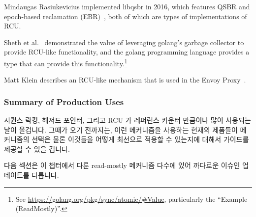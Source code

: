 Mindaugas Rasiukevicius implemented libqsbr in 2016, which features
QSBR and epoch-based reclamation
(EBR)~\cite{MindaugasRasiukevicius2016libqsbr},
both of which are types of implementations of RCU.

Sheth et al.~\cite{HarshalSheth2016goRCU}
demonstrated the value of leveraging golang's garbage
collector to provide RCU-like functionality, and
the golang programming language provides a  type that can
provide this functionality.\footnote{
	See \url{https://golang.org/pkg/sync/atomic/\#Value}, particularly
	the ``Example (ReadMostly)''.}

Matt Klein describes an RCU-like mechanism that is used in the Envoy
Proxy~\cite{MattKlein2017EnvoyRCU}.
\fi

\subsubsection{Summary of Production Uses}
\label{sec:defer:Summary of Production Uses}

시퀀스 락킹, 해저드 포인터, 그리고 RCU 가 레퍼런스 카운터 만큼이나 많이
사용되는 날이 올겁니다.
그때가 오기 전까지는, 이런 메커니즘을 사용하는 현재의 제품들이 메커니즘의
선택은 물론 이것들을 어떻게 최선으로 적용할 수 있는지에 대해서 가이드를 제공할
수 있을 겁니다.

다음 섹션은 이 챕터에서 다룬 read-mostly 메커니즘 다수에 있어 까다로운 이슈인
업데이트를 다룹니다.
\iffalse

Perhaps the time will come when sequence locking, hazard pointers, and
RCU are all as heavily used and as well known as are reference counters.
Until that time comes, the current production uses of these mechanisms
should help guide the choice of mechanism as well as showing how best
to apply each of them.

The next section discusses updates, a ticklish issue for many of the
read-mostly mechanisms described in this chapter.
\fi
